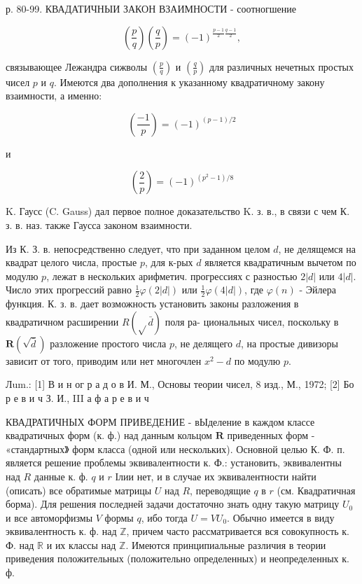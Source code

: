\documentclass[10pt]{article}
\begin{document}
р. 80-99. КВАДАТИЧНЫИ ЗАКОН ВЗАИМНОСТИ - соотногшение



\[

\left(\frac{p}{q}\right)\left(\frac{q}{p}\right)=(-1)^{\frac{p-1}{2} \frac{q-1}{2}},

\]



связывающее Лежандра сижволы $\left(\frac{p}{q}\right)$ и $\left(\frac{q}{p}\right)$ для различных нечетных простых чисел $p$ и $q$. Имеются два дополнения к указанному квадратичному закону взаимности, а именно:



\[

\left(\frac{-1}{p}\right)=(-1)^{(p-1) / 2}

\]



и



\[

\left(\frac{2}{p}\right)=(-1)^{\left(p^{2}-1\right) / 8}

\]



K. Гаусс (C. Gauss) дал первое полное доказательство K. з. в., в связи с чем К. з. в. наз. также Гаусса законом взаимности.



Из К. З. в. непосредственно следует, что при заданном целом $d$, не делящемся на квадрат целого числа, простые $p$, для к-рых $d$ является квадратичным вычетом по модулю $p$, лежат в нескольких арифметич. прогрессиях с разностью $2|d|$ или $4|d|$. Число этих прогрессий равно $\frac{1}{2} \varphi(2|d|)$ или $\frac{1}{2} \varphi(4|d|)$, где $\varphi(n)$ - Эйлера функция. К. з. в. дает возможность установить законы разложения в квадратичном расширении $R(\sqrt{ } \bar{d})$ поля ра- циональных чисел, поскольку в $\boldsymbol{R}(\sqrt{\bar{d}})$ разложение простого числа $p$, не делящего $d$, на простые дивизоры зависит от того, приводим или нет многочлен $x^{2}-d$ по модулю $p$.



Лum.: [1] В и н ог р а д о в И. М., Основы теории чисел, 8 изд., М., 1972; [2] Бо р е в и ч З. И., III а ф а р е в и ч



КВАДРАТИЧНЫХ ФОРМ ПРИВЕДЕНИЕ - вЫделение в каждом классе квадратичных форм (к. ф.) над данным кольцом $\boldsymbol{R}$ приведенных форм - «стандартных》 форм класса (одной или нескольких). Основной целью К. Ф. п. является решение проблемы эквивалентности к. Ф.: установить, эквивалентны над $R$ данные к. ф. $q$ и $r$ Ілии нет, и в случае их эквивалентности найти (описать) все обратимые матрицы $U$ над $R$, переводящие $q$ в $r$ (см. Квадратичная борма). Для решения последней задачи достаточно знать одну такую матрицу $U_{0}$ и все автоморфизмы $V$ формы $q$, ибо тогда $U=V U_{0}$. Обычно имеется в виду эквивалентность к. ф. над $\mathbb{Z}$, причем часто рассматривается вся совокупность к. Ф. над $\mathbb{R}$ и их классы над $\mathbb{Z}$. Имеются принципиальные различия в теории приведения положительных (положительно определенных) и неопределенных к. ф.
\end{document}
